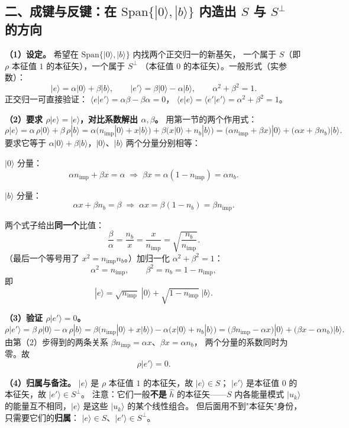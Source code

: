 \documentclass[11pt]{ctexart}
\begin{document}
\subsection{二、成键与反键：在 $\mathrm{Span}\{|0\rangle,|b\rangle\}$ 内造出 $S$ 与 $S^{\perp}$ 的方向}

\textbf{（1）设定。}
希望在 $\mathrm{Span}\{|0\rangle,|b\rangle\}$ 内找两个正交归一的新基矢，
一个属于 $S$（即 $\rho$ 本征值 $1$ 的本征矢），一个属于 $S^{\perp}$
（本征值 $0$ 的本征矢）。一般形式（实参数）：
\[
|e\rangle=\alpha|0\rangle+\beta|b\rangle,\qquad
|e'\rangle=\beta|0\rangle-\alpha|b\rangle,
\qquad
\alpha^2+\beta^2=1 .
\]
正交归一可直接验证：
$\langle e|e'\rangle=\alpha\beta-\beta\alpha=0$，
$\langle e|e\rangle=\langle e'|e'\rangle=\alpha^2+\beta^2=1$。

\textbf{（2）要求 $\rho|e\rangle=|e\rangle$，对比系数解出 $\alpha,\beta$。}
用第一节的两个作用式：
\[
\rho|e\rangle
=
\alpha\,\rho|0\rangle+\beta\,\rho|b\rangle
=
\alpha\big(n_{\mathrm{imp}}|0\rangle+x|b\rangle\big)
+\beta\big(x|0\rangle+n_b|b\rangle\big)
=
\big(\alpha n_{\mathrm{imp}}+\beta x\big)|0\rangle
+\big(\alpha x+\beta n_b\big)|b\rangle .
\]
要求它等于 $\alpha|0\rangle+\beta|b\rangle$，$|0\rangle$、$|b\rangle$ 两个分量分别相等：

$|0\rangle$ 分量：
\[
\alpha n_{\mathrm{imp}}+\beta x=\alpha
\;\Rightarrow\;
\beta x=\alpha(1-n_{\mathrm{imp}})=\alpha n_b .
\]

$|b\rangle$ 分量：
\[
\alpha x+\beta n_b=\beta
\;\Rightarrow\;
\alpha x=\beta(1-n_b)=\beta n_{\mathrm{imp}} .
\]

两个式子给出\textbf{同一个}比值：
\[
\frac{\beta}{\alpha}
=
\frac{n_b}{x}
=
\frac{x}{n_{\mathrm{imp}}}
=
\sqrt{\frac{n_b}{n_{\mathrm{imp}}}} .
\]
（最后一个等号用了 $x^2=n_{\mathrm{imp}}n_b$。）加归一化 $\alpha^2+\beta^2=1$：
\[
\alpha^2=n_{\mathrm{imp}},\qquad
\beta^2=n_b=1-n_{\mathrm{imp}} ,
\]
即
\[
|e\rangle
=
\sqrt{n_{\mathrm{imp}}}\;|0\rangle+\sqrt{1-n_{\mathrm{imp}}}\;|b\rangle .
\]

\textbf{（3）验证 $\rho|e'\rangle=0$。}
\[
\rho|e'\rangle
=
\beta\,\rho|0\rangle-\alpha\,\rho|b\rangle
=
\beta\big(n_{\mathrm{imp}}|0\rangle+x|b\rangle\big)
-\alpha\big(x|0\rangle+n_b|b\rangle\big)
=
\big(\beta n_{\mathrm{imp}}-\alpha x\big)|0\rangle
+\big(\beta x-\alpha n_b\big)|b\rangle .
\]
由第（2）步得到的两条关系
$\beta n_{\mathrm{imp}}=\alpha x$、$\beta x=\alpha n_b$，
两个分量的系数同时为零。故
\[
\rho|e'\rangle=0 .
\]

\textbf{（4）归属与备注。}
$|e\rangle$ 是 $\rho$ 本征值 $1$ 的本征矢，故 $|e\rangle\in S$；
$|e'\rangle$ 是本征值 $0$ 的本征矢，故 $|e'\rangle\in S^{\perp}$。
注意：它们一般\textbf{不是} $\hat h$ 的本征矢——$S$ 内各能量模式 $|u_k\rangle$
的能量互不相同，$|e\rangle$ 是这些 $|u_k\rangle$ 的某个线性组合。
但后面用不到"本征矢"身份，只需要它们的\textbf{归属}：
$|e\rangle\in S$、$|e'\rangle\in S^{\perp}$。
\end{document}
